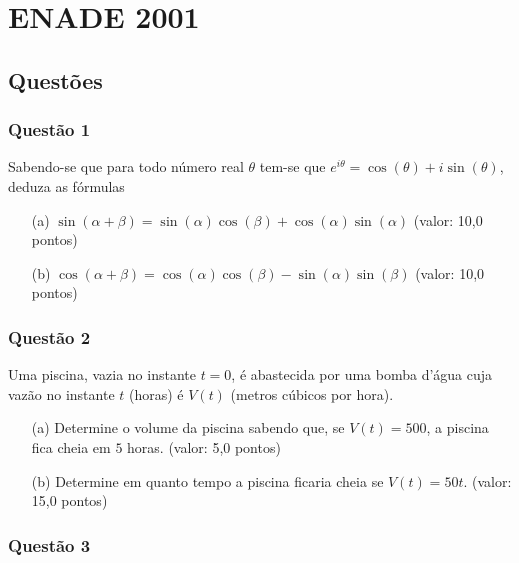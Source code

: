 \chapter{ENADE 2001}

\section{\color{blue} Quest\~oes}

\subsection{\color{blue} Quest\~ao 1}

Sabendo-se que para todo n\'umero real $\theta$ tem-se que $e^{i\theta}= \cos (\theta) + i \sin (\theta)$, deduza as f\'ormulas

\begin{enumerate}

\item[(a)] $\sin (\alpha + \beta) = \sin (\alpha) \cos (\beta) + \cos (\alpha) \sin (\alpha)$ (valor: 10,0 pontos)

\item[(b)] $\cos (\alpha + \beta) = \cos (\alpha) \cos (\beta) - \sin (\alpha) \sin (\beta)$ (valor: 10,0 pontos)

\end{enumerate}

\subsection{\color{blue} Quest\~ao 2}

Uma piscina, vazia no instante $t = 0$, \'e abastecida por uma bomba d’\'agua cuja vaz\~ao no instante $t$ (horas) \'e $V(t)$ (metros c\'ubicos por hora).

\begin{enumerate}

\item[(a)] Determine o volume da piscina sabendo que, se $V(t) = 500$, a piscina fica cheia em $5$ horas. (valor: 5,0 pontos)

\item[(b)] Determine em quanto tempo a piscina ficaria cheia se $V(t) = 50 t$. (valor: 15,0 pontos)

\end{enumerate}

\subsection{\color{blue} Quest\~ao 3}


